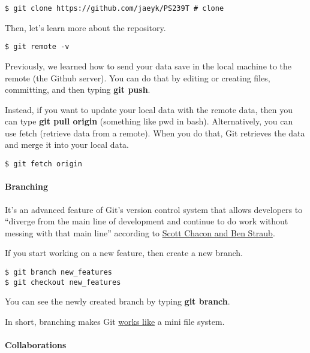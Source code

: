 \documentclass[
]{book}
\begin{document}
\begin{verbatim}
$ git clone https://github.com/jaeyk/PS239T # clone 
\end{verbatim}

Then, let's learn more about the repository.

\begin{verbatim}
$ git remote -v 
\end{verbatim}

Previously, we learned how to send your data save in the local machine to the remote (the Github server). You can do that by editing or creating files, committing, and then typing \textbf{git push}.

Instead, if you want to update your local data with the remote data, then you can type \textbf{git pull origin} (something like pwd in bash). Alternatively, you can use fetch (retrieve data from a remote). When you do that, Git retrieves the data and merge it into your local data.

\begin{verbatim}
$ git fetch origin
\end{verbatim}

\hypertarget{branching}{%
\paragraph{Branching}\label{branching}}

It's an advanced feature of Git's version control system that allows developers to ``diverge from the main line of development and continue to do work without messing with that main line'' according to \href{https://git-scm.com/book/en/v1/Git-Branching}{Scott Chacon and Ben Straub}.

If you start working on a new feature, then create a new branch.

\begin{verbatim}
$ git branch new_features
$ git checkout new_features
\end{verbatim}

You can see the newly created branch by typing \textbf{git branch}.

In short, branching makes Git \href{https://git-scm.com/book/en/v2/Getting-Started-Git-Basics}{works like} a mini file system.

\hypertarget{collaborations}{%
\paragraph{Collaborations}\label{collaborations}}
\end{document}
